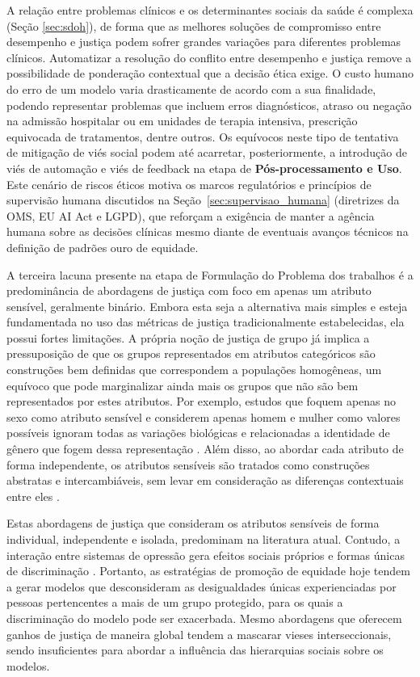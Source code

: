 A relação entre problemas clínicos e os determinantes sociais da saúde é complexa (Seção \ref{sec:sdoh}), de forma que as melhores soluções de compromisso entre desempenho e justiça podem sofrer grandes variações para diferentes problemas clínicos. Automatizar a resolução do conflito entre desempenho e justiça remove a possibilidade de ponderação contextual que a decisão ética exige. O custo humano do erro de um modelo varia drasticamente de acordo com a sua finalidade, podendo representar problemas que incluem erros diagnósticos, atraso ou negação na admissão hospitalar ou em unidades de terapia intensiva, prescrição equivocada de tratamentos, dentre outros. Os equívocos neste tipo de tentativa de mitigação de viés social podem até acarretar, posteriormente, a introdução de viés de automação e viés de feedback na etapa de \textbf{Pós-processamento e Uso}. Este cenário de riscos éticos motiva os marcos regulatórios e princípios de supervisão humana discutidos na Seção~\ref{sec:supervisao_humana} (diretrizes da OMS, EU AI Act e LGPD), que reforçam a exigência de manter a agência humana sobre as decisões clínicas mesmo diante de eventuais avanços técnicos na definição de padrões ouro de equidade.

A terceira lacuna presente na etapa de Formulação do Problema dos trabalhos é a predominância de abordagens de justiça com foco em apenas um atributo sensível, geralmente binário. Embora esta seja a alternativa mais simples e esteja fundamentada no uso das métricas de justiça tradicionalmente estabelecidas, ela possui fortes limitações. A própria noção de justiça de grupo já implica a pressuposição de que os grupos representados em atributos categóricos são construções bem definidas que correspondem a populações homogêneas, um equívoco que pode marginalizar ainda mais os grupos que não são bem representados por estes atributos. Por exemplo, estudos que foquem apenas no sexo como atributo sensível e considerem apenas homem e mulher como valores possíveis ignoram todas as variações biológicas e relacionadas a identidade de gênero que fogem dessa representação \cite{park2022fairness}. Além disso, ao abordar cada atributo de forma independente, os atributos sensíveis são tratados como construções abstratas e intercambiáveis, sem levar em consideração as diferenças contextuais entre eles \cite{pfohl2021empirical}.

Estas abordagens de justiça que consideram os atributos sensíveis de forma individual, independente e isolada, predominam na literatura atual. Contudo, a interação entre sistemas de opressão gera efeitos sociais próprios e formas únicas de discriminação \cite{crenshaw2022demarginalizing,buolamwini2018gender}. Portanto, as estratégias de promoção de equidade hoje tendem a gerar modelos que desconsideram as desigualdades únicas experienciadas por pessoas pertencentes a mais de um grupo protegido, para os quais a discriminação do modelo pode ser exacerbada. Mesmo abordagens que oferecem ganhos de justiça de maneira global tendem a mascarar vieses interseccionais, sendo insuficientes para abordar a influência das hierarquias sociais sobre os modelos.

